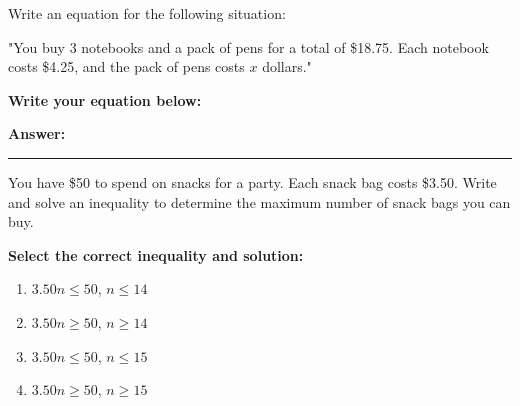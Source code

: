 \documentclass[12pt]{article}
\begin{document}
\begin{tcolorbox}[colframe=black!50, colback=white, title=\textbf{Problem 7 (7.EE.B.4)}]
Write an equation for the following situation:

"You buy 3 notebooks and a pack of pens for a total of \$18.75. Each notebook costs \$4.25, and the pack of pens costs \(x\) dollars."

\textbf{Write your equation below:}

\vspace{3cm}

\textbf{Answer:} \rule{0.5\textwidth}{0.4mm}
\end{tcolorbox}

\begin{tcolorbox}[colframe=black!50, colback=white, title=\textbf{Problem 8 (7.EE.B.4)}]
You have \$50 to spend on snacks for a party. Each snack bag costs \$3.50. Write and solve an inequality to determine the maximum number of snack bags you can buy.

\textbf{Select the correct inequality and solution:}
\begin{enumerate}[label=(\Alph*)]
    \item \( 3.50n \leq 50 \), \( n \leq 14 \)
    \item \( 3.50n \geq 50 \), \( n \geq 14 \)
    \item \( 3.50n \leq 50 \), \( n \leq 15 \)
    \item \( 3.50n \geq 50 \), \( n \geq 15 \)
\end{enumerate}

\vspace{2.5cm}
\end{tcolorbox}
\end{document}
